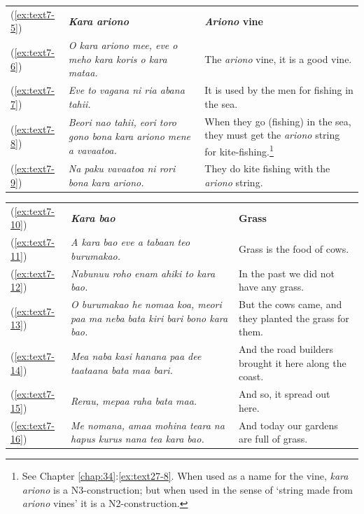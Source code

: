 \documentclass[output=paper]{langscibook}
\begin{document}
\begin{xltabular}{\textwidth}{lXX}
    (\ref{ex:text7-5})&\textit{\textbf{Kara ariono}}&\textbf{\textit{Ariono} vine}\\
    (\ref{ex:text7-6})&\textit{O kara ariono mee, eve o meho kara koris o kara mataa.}&The \textit{ariono} vine, it is a good vine.\\
    (\ref{ex:text7-7})&\textit{Eve to vagana ni ria abana tahii.}&It is used by the men for fishing in the sea.\\
    (\ref{ex:text7-8})&\textit{Beori nao tahii, eori toro gono bona kara ariono mene a vavaatoa.}&When they go (fishing) in the sea, they must get the \textit{ariono} string for kite-fishing.\footnote{See Chapter \ref{chap:34}:\ref{ex:text27-8}. When used as a name for the vine, \textit{kara ariono} is a N3-construction; but when used in the sense of `string made from \textit{ariono} vines' it is a N2-construction.}\\
    (\ref{ex:text7-9})&\textit{Na paku vavaatoa ni rori bona kara ariono.}&They do kite fishing with the \textit{ariono} string.\\
\end{xltabular}
\begin{xltabular}{\textwidth}{lXX}
	(\ref{ex:text7-10})&\textbf{\textit{Kara bao}}&\textbf{Grass}\\
	(\ref{ex:text7-11})&\textit{A kara bao eve a tabaan teo burumakao.}&Grass is the food of cows.\\
	(\ref{ex:text7-12})&\textit{Nabunuu roho enam ahiki to kara bao.}&In the past we did not have any grass.\\
	(\ref{ex:text7-13})&\textit{O burumakao he nomaa koa, meori paa ma neba bata kiri bari bono kara bao.}&But the cows came, and they planted the grass for them.\\
	(\ref{ex:text7-14})&\textit{Mea naba kasi hanana paa dee taataana bata maa bari.}&And the road builders brought it here along the coast.\\
	(\ref{ex:text7-15})&\textit{Rerau, mepaa raha bata maa.}&And so, it spread out here.\\
	(\ref{ex:text7-16})&\textit{Me nomana, amaa mohina teara na hapus kurus nana tea kara bao.}&And today our gardens are full of grass.\\
\end{xltabular}
\end{document}
